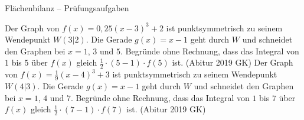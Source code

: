 \begin{aufgabe}{Flächenbilanz – Prüfungsaufgaben}
\begin{teile}
\teil Der Graph von $f(x) = 0{,}25(x - 3)^3 + 2$ ist punktsymmetrisch zu seinem Wendepunkt $W(3|2)$. Die Gerade $g(x) = x - 1$ geht durch $W$ und schneidet den Graphen bei $x = 1$, $3$ und $5$. Begründe ohne Rechnung, dass das Integral von $1$ bis $5$ über $f(x)$ gleich $\frac{1}{2} \cdot (5 - 1) \cdot f(5)$ ist. \hfill (Abitur 2019 GK)
\teil Der Graph von $f(x) = \frac{1}{9}(x - 4)^3 + 3$ ist punktsymmetrisch zu seinem Wendepunkt $W(4|3)$. Die Gerade $g(x) = x - 1$ geht durch $W$ und schneidet den Graphen bei $x = 1$, $4$ und $7$. Begründe ohne Rechnung, dass das Integral von $1$ bis $7$ über $f(x)$ gleich $\frac{1}{2} \cdot (7 - 1) \cdot f(7)$ ist. \hfill (Abitur 2019 GK)
\end{teile}
\end{aufgabe}
